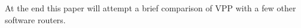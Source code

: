 \small

At the end this paper will attempt a brief comparison of VPP with a few other software routers. 

\blindtext

\blindtext
